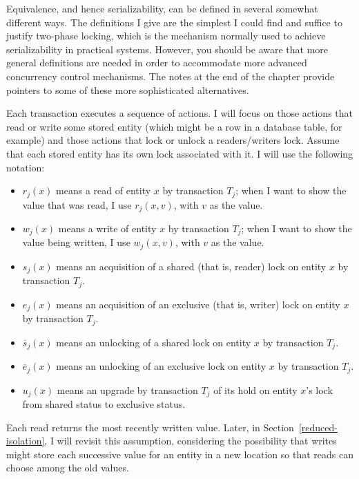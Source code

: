 Equivalence, and hence serializability, can be defined in several
somewhat different ways.  The definitions I give are the simplest I
could find and suffice to justify two-phase locking, which is the
mechanism normally used to achieve serializability in practical
systems.  However, you should be aware that more general definitions
are needed in order to accommodate more advanced concurrency control
mechanisms.  The notes at the end of the chapter provide pointers to
some of these more sophisticated alternatives.

Each transaction executes a sequence of actions.  I will focus on
those actions that read or write some stored entity (which might be a
row in a database table, for example) and those actions that lock or
unlock a readers/writers lock.  Assume that each stored entity
has its own lock associated with it.  I will use the following
notation:
\begin{itemize}
\item
$r_j(x)$ means a read of entity $x$ by transaction $T_j$; when I want
  to show the value that was read, I use $r_j(x, v)$, with $v$ as the value.
\item
$w_j(x)$ means a write of entity $x$ by transaction $T_j$; when I want
  to show the value being written, I use $w_j(x, v)$, with $v$ as the value.
\item
$s_j(x)$ means an acquisition of a shared (that is, reader) lock on entity $x$ by transaction $T_j$.
\item
$e_j(x)$ means an acquisition of an exclusive (that is, writer) lock on
  entity $x$ by transaction $T_j$.
\item
$\overline{s}_j(x)$ means an unlocking of a shared lock on entity $x$ by transaction $T_j$.
\item
$\overline{e}_j(x)$ means an unlocking of an exclusive lock on entity
  $x$ by transaction $T_j$.
\item
$u_j(x)$ means an upgrade by transaction $T_j$ of its hold on entity
  $x$'s lock from shared status to exclusive status.
\end{itemize}
Each read returns the most recently written value.  Later, in
Section~\ref{reduced-isolation}, I will revisit this assumption,
considering the possibility that writes might store each successive
value for an entity in a new location so that reads can choose
among the old values.

